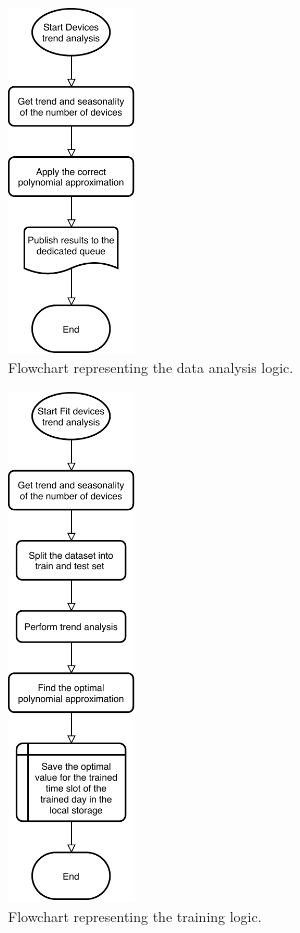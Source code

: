 \begin{figure}[h]
\centering 
\includegraphics[width=0.3\textwidth]{images/flowML} 
\caption{Flowchart representing the data analysis logic.}
\label{fig:flowML}
\end{figure}

\begin{figure}[h]
\centering 
\includegraphics[width=0.3\textwidth]{images/flowtrainML} 
\caption{Flowchart representing the training logic.}
\label{fig:flowtrainML}
\end{figure}

